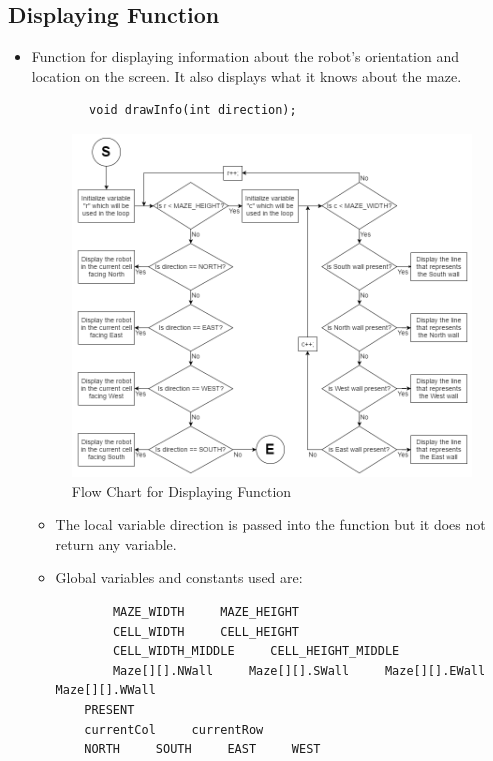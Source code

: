 \documentclass[11pt]{article}
\begin{document}
\subsection{Displaying Function}
\begin{itemize}
\item Function for displaying information about the robot's orientation and location on the screen. It also displays what it knows about the maze. 
	\begin{verbatim}
		void drawInfo(int direction);
	\end{verbatim}
\begin{figure}[htp]
\centering 
\includegraphics[scale=0.57]{images/Software_Flowchart/Drawing_Function.png}
\caption{Flow Chart for Displaying Function}
\label{}
\end{figure}
	\begin{itemize}
	\item The local variable direction is passed into the function but it does not return any variable.
	\item Global variables and constants used are:
	\begin{verbatim}
		MAZE_WIDTH     MAZE_HEIGHT
		CELL_WIDTH     CELL_HEIGHT
		CELL_WIDTH_MIDDLE     CELL_HEIGHT_MIDDLE
		Maze[][].NWall     Maze[][].SWall     Maze[][].EWall     Maze[][].WWall
	PRESENT
	currentCol     currentRow
	NORTH     SOUTH     EAST     WEST
	\end{verbatim}
	\end{itemize}
\end{itemize}
\newpage
\end{document}
